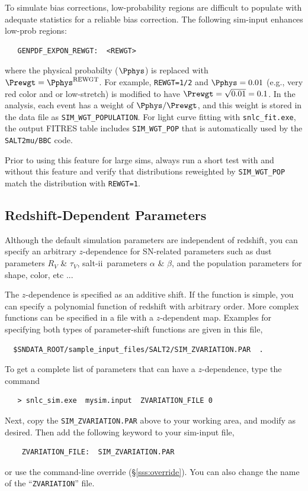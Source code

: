 \documentclass[12pt]{article}
\newcommand{\SALTII}{{\sc salt-ii}}
\begin{document}
To simulate bias corrections, low-probability regions are difficult
to populate with adequate statistics for a reliable bias correction.
The following sim-input enhances low-prob regions:
\begin{verbatim}
   GENPDF_EXPON_REWGT:  <REWGT>
\end{verbatim}
%
where the physical probabilty ($\Pphys$) is replaced with
$\Prewgt = \Pphys^{\rm REWGT}$. 
For example, {\tt REWGT=1/2} and $\Pphys=0.01$ (e.g., very red color and or low-stretch)
is modified to have $\Prewgt=\sqrt{0.01} = 0.1$.
In the analysis, each event has a weight of $\Pphys/\Prewgt$,
and this weight is stored in the data file as {\tt SIM\_WGT\_POPULATION}.
For light curve fitting with {\tt snlc\_fit.exe}, the output FITRES table
includes {\tt SIM\_WGT\_POP} that is automatically used by the 
{\tt SALT2mu/BBC} code.

Prior to using this feature for large sims, always run a short test with and without
this feature and verify that distributions reweighted by {\tt SIM\_WGT\_POP}
match the distribution with {\tt REWGT=1}.


   \clearpage
   \subsection{Redshift-Dependent Parameters}
   \label{subsec:zvar}

Although the default simulation parameters are 
independent of redshift, you can specify an arbitrary 
$z$-dependence for SN-related parameters such as
dust parameters $R_V$ \& $\tau_V$, 
\SALTII\ parameters $\alpha$ \& $\beta$, and
the population parameters for shape, color, etc ...

The $z$-dependence is specified as an additive shift.
If the function is simple, you can specify a polynomial
function of redshift with arbitrary order.
More complex functions can be specified in a file with a $z$-dependent map.
Examples for specifying both types of parameter-shift 
functions are given in this file,
%
\begin{verbatim}
  $SNDATA_ROOT/sample_input_files/SALT2/SIM_ZVARIATION.PAR  .
\end{verbatim}
To get a complete list of parameters that can have a
$z$-dependence, type the command
\begin{verbatim}
   > snlc_sim.exe  mysim.input  ZVARIATION_FILE 0 
\end{verbatim}
%
Next, copy the {\tt SIM\_ZVARIATION.PAR} above to your working area,
and modify as desired. Then add the following keyword to 
your sim-input file,
\begin{verbatim}
    ZVARIATION_FILE:  SIM_ZVARIATION.PAR
\end{verbatim}
%
or use the command-line override (\S\ref{sss:override}).
You can also change the name of the ``{\tt ZVARIATION}'' file.
\end{document}
